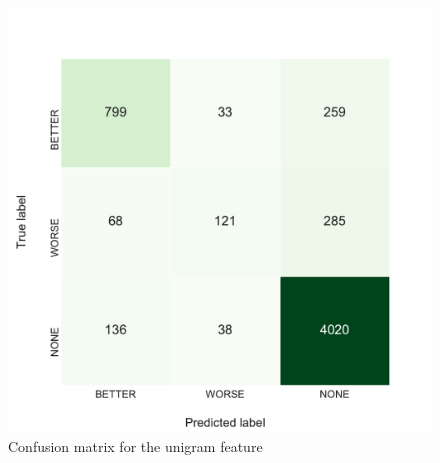 \begin{figure}[h]
\begin{minipage}{.5\linewidth}
     \caption{Confusion matrix for the unigram feature} 
       \label{tbl:3_conf_uni}
 \centering
	\includegraphics[width=1\linewidth]{images/experiments/conf-Unigrams_False}
    \end{minipage} 
\end{figure}


%
%
%
%  
%
%

